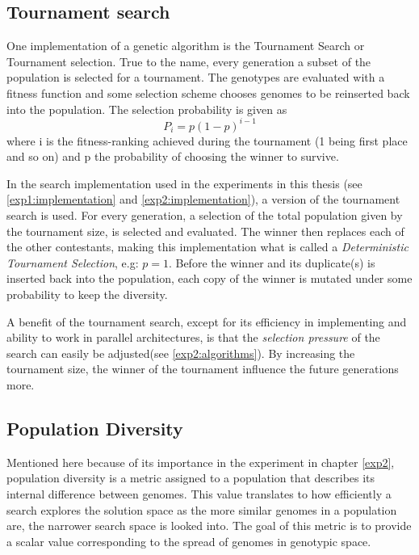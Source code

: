 \subsection{Tournament search}
One implementation of a genetic algorithm is the Tournament Search or Tournament selection. True to the name, every generation a subset of the population is selected for a tournament. The genotypes are evaluated with a fitness function and some selection scheme chooses genomes to be reinserted back into the population. The selection probability is given as 
\begin{equation}
    \label{eq:tournamentsearch}
    P_{i} = p(1-p)^{i-1}
\end{equation}
where i is the fitness-ranking achieved during the tournament (1 being first place and so on) and p the probability of choosing the winner to survive.  

In the search implementation used in the experiments in this thesis (see \ref{exp1:implementation} and \ref{exp2:implementation}), a version of the tournament search is used. For every generation, a selection of the total population given by the tournament size, is selected and evaluated. The winner then replaces each of the other contestants, making this implementation what is called a \textit{Deterministic Tournament Selection}, e.g: \(p=1\). Before the winner and its duplicate(s) is inserted back into the population, each copy of the winner is mutated under some probability to keep the diversity. 

A benefit of the tournament search, except for its efficiency in implementing and ability to work in parallel architectures, is that the \textit{selection pressure} of the search can easily be adjusted(see \ref{exp2:algorithms}). By increasing the tournament size, the winner of the tournament influence the future generations more.

\subsection{Population Diversity}
\label{background:diversity}
Mentioned here because of its importance in the experiment in chapter \ref{exp2}, population diversity is a metric assigned to a population that describes its internal difference between genomes. This value translates to how efficiently a search explores the solution space as the more similar genomes in a population are, the narrower search space is looked into. The goal of this metric is to provide a scalar value corresponding to the spread of genomes in genotypic space. 

